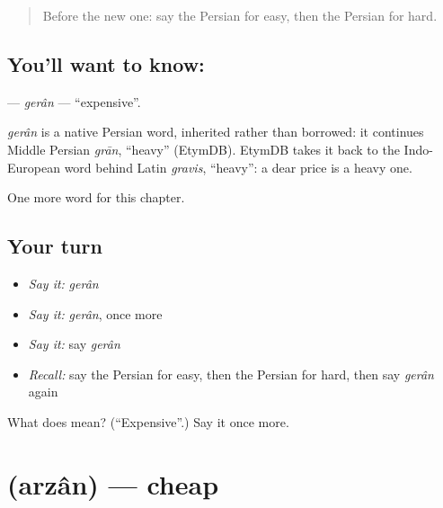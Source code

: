 \label{lesson:FA-C60-geran}



\begin{quote}
Before the new one: say the Persian for easy, then the Persian for hard.
\end{quote}

\subsection*{You'll want to know: }
\textbf{} — \emph{gerân} — \textquotedblleft{}expensive\textquotedblright{}.

\begin{cousinweb}
\emph{gerân} is a native Persian word, inherited rather than borrowed: it continues Middle Persian \emph{grān}, \textquotedblleft{}heavy\textquotedblright{} (EtymDB). EtymDB takes it back to the Indo-European word behind Latin \emph{gravis}, \textquotedblleft{}heavy\textquotedblright{}: a dear price is a heavy one.
\end{cousinweb}

\begin{grammarlens}[title={What you've built}]
One more word for this chapter.
\end{grammarlens}

\subsection*{Your turn}
\begin{itemize}
\raggedright
  \item \emph{Say it:} \emph{gerân}
  \item \emph{Say it:} \emph{gerân}, once more
  \item \emph{Say it:} say \emph{gerân}
  \item \emph{Recall:} say the Persian for easy, then the Persian for hard, then say \emph{gerân} again
\end{itemize}

\begin{tcolorbox}[breakable,colback=teal!4,colframe=teal!35!black,title={Before you move on}]
What does  mean? (\textquotedblleft{}Expensive\textquotedblright{}.) Say it once more.
\end{tcolorbox}
\section[\texorpdfstring{\fa{ارزان} (arzân)}{ارزان (arzân)}]{ (arzân) — cheap}


